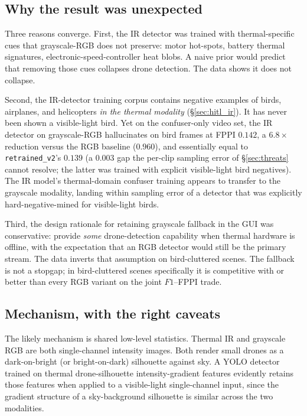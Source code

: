 \documentclass[12pt,a4paper,oneside,openright]{book}
\begin{document}
\subsection{Why the result was unexpected}

Three reasons converge. First, the IR detector was trained with thermal-specific cues that grayscale-RGB does not preserve: motor hot-spots, battery thermal signatures, electronic-speed-controller heat blobs. A naive prior would predict that removing those cues collapses drone detection. The data shows it does not collapse.

Second, the IR-detector training corpus contains negative examples of birds, airplanes, and helicopters \emph{in the thermal modality} (\S\ref{sec:hitl_ir}). It has never been shown a visible-light bird. Yet on the confuser-only video set, the IR detector on grayscale-RGB hallucinates on bird frames at FPPI $0.142$, a $6.8\times$ reduction versus the RGB baseline ($0.960$), and essentially equal to \texttt{retrained\_v2}'s $0.139$ (a $0.003$ gap the per-clip sampling error of \S\ref{sec:threats} cannot resolve; the latter was trained with explicit visible-light bird negatives). The IR model's thermal-domain confuser training appears to transfer to the grayscale modality, landing within sampling error of a detector that was explicitly hard-negative-mined for visible-light birds.

Third, the design rationale for retaining grayscale fallback in the GUI was conservative: provide \emph{some} drone-detection capability when thermal hardware is offline, with the expectation that an RGB detector would still be the primary stream. The data inverts that assumption on bird-cluttered scenes. The fallback is not a stopgap; in bird-cluttered scenes specifically it is competitive with or better than every RGB variant on the joint $F1$--FPPI trade.

\subsection{Mechanism, with the right caveats}

The likely mechanism is shared low-level statistics. Thermal IR and grayscale RGB are both single-channel intensity images. Both render small drones as a dark-on-bright (or bright-on-dark) silhouette against sky. A YOLO detector trained on thermal drone-silhouette intensity-gradient features evidently retains those features when applied to a visible-light single-channel input, since the gradient structure of a sky-background silhouette is similar across the two modalities.
\end{document}
